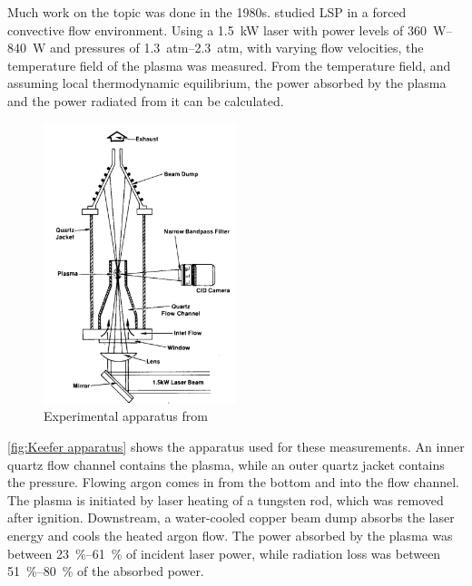         Much work on the topic was done in the 1980s. \textcite{keeferPowerAbsorptionLasersustained1986a} studied LSP in a forced convective flow environment. Using a \qty{1.5}{kW}  laser with power levels of \qtyrange{360}{840}{W} and pressures of \qtyrange{1.3}{2.3}{atm}, with varying flow velocities, the temperature field of the plasma was measured. From the temperature field, and assuming local thermodynamic equilibrium, the power absorbed by the plasma and the power radiated from it can be calculated.
        \begin{figure}[!ht]
            \centering
            \includegraphics[width=0.5\textwidth]{assets/2 background/UTSI (Keefer) Apparatus.png}
            \caption{Experimental apparatus from \textcite{keeferPowerAbsorptionLasersustained1986a}}
            \label{fig:Keefer apparatus}
        \end{figure}
        \autoref{fig:Keefer apparatus} shows the apparatus used for these measurements. An inner quartz flow channel contains the plasma, while an outer quartz jacket contains the pressure. Flowing argon comes in from the bottom and into the flow channel. The plasma is initiated by laser heating of a tungsten rod, which was removed after ignition. Downstream, a water-cooled copper beam dump absorbs the laser energy and cools the heated argon flow. The power absorbed by the plasma was between \qtyrange{23}{61}{\%} of incident laser power, while radiation loss was between \qtyrange{51}{80}{\%} of the absorbed power.

